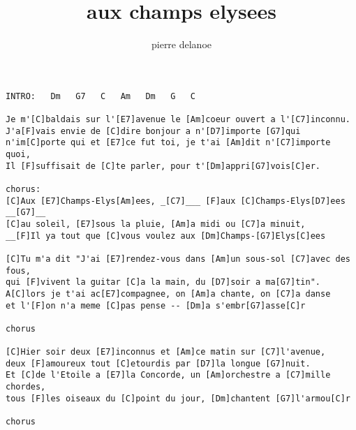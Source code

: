 \author{pierre delanoe}
\title{aux champs elysees}
\maketitle
\begin{verbatim}
INTRO:   Dm   G7   C   Am   Dm   G   C

Je m'[C]baldais sur l'[E7]avenue le [Am]coeur ouvert a l'[C7]inconnu.
J'a[F]vais envie de [C]dire bonjour a n'[D7]importe [G7]qui
n'im[C]porte qui et [E7]ce fut toi, je t'ai [Am]dit n'[C7]importe quoi,
Il [F]suffisait de [C]te parler, pour t'[Dm]appri[G7]vois[C]er.

chorus:
[C]Aux [E7]Champs-Elys[Am]ees, _[C7]___ [F]aux [C]Champs-Elys[D7]ees __[G7]__
[C]au soleil, [E7]sous la pluie, [Am]a midi ou [C7]a minuit,
__[F]Il ya tout que [C]vous voulez aux [Dm]Champs-[G7]Elys[C]ees

[C]Tu m'a dit "J'ai [E7]rendez-vous dans [Am]un sous-sol [C7]avec des fous,
qui [F]vivent la guitar [C]a la main, du [D7]soir a ma[G7]tin".
A[C]lors je t'ai ac[E7]compagnee, on [Am]a chante, on [C7]a danse
et l'[F]on n'a meme [C]pas pense -- [Dm]a s'embr[G7]asse[C]r

chorus

[C]Hier soir deux [E7]inconnus et [Am]ce matin sur [C7]l'avenue,
deux [F]amoureux tout [C]etourdis par [D7]la longue [G7]nuit.
Et [C]de l'Etoile a [E7]la Concorde, un [Am]orchestre a [C7]mille chordes,
tous [F]les oiseaux du [C]point du jour, [Dm]chantent [G7]l'armou[C]r

chorus
\end{verbatim}